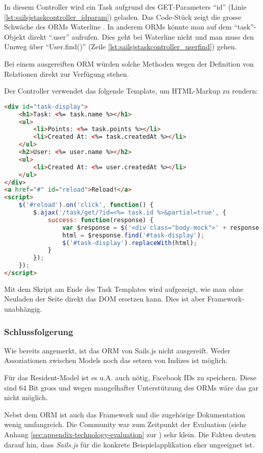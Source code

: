 In diesem Controller wird ein Task aufgrund des GET-Parameters ``id'' (Linie \ref{lst:sailsjstaskcontroller_idparam}) geladen. Das Code-Stück zeigt die grosse Schwäche des ORMs Waterline \cite{Waterline}. In anderem ORMs könnte man auf dem ``task''-Objekt direkt ``.user'' aufrufen. Dies geht bei Waterline nicht und man muss den Umweg über ``User.find()'' (Zeile \ref{lst:sailsjstaskcontroller_userfind}) gehen.

Bei einem ausgereiften ORM würden solche Methoden wegen der Definition von Relationen direkt zur Verfügung stehen.

Der Controller verwendet das folgende Template, um HTML-Markup zu rendern:

\begin{lstlisting}[language=HTML, caption=Task Template]
<div id="task-display">
	<h1>Task: <%= task.name %></h1>
	<ul>
		<li>Points: <%= task.points %></li>
		<li>Created At: <%= task.createdAt %></li>
	</ul>
	<h2>User: <%= user.name %></h2>
	<ul>
		<li>Created At: <%= user.createdAt %></li>
	</ul>
</div>
<a href="#" id="reload">Reload!</a>
<script>
	$('#reload').on('click', function() {
		$.ajax('/task/get/?id=<%= task.id %>&partial=true', {
			success: function(response) {
				var $response = $('<div class="body-mock">' + response + '</div>');
				html = $response.find('#task-display');
				$('#task-display').replaceWith(html);
			}
		});
	});
</script>
\end{lstlisting}

Mit dem Skript am Ende des Task Templates wird aufgezeigt, wie man ohne Neuladen der Seite direkt das DOM ersetzen kann. Dies ist aber Framework-unabhängig.

\subsubsection*{Schlussfolgerung}

Wie bereits angemerkt, ist das ORM von Sails.js nicht ausgereift. Weder Assoziationen zwischen Models \cite{SailsjsModelAssociations} noch das setzen von Indizes ist möglich.

Für das Resident-Model ist es u.A. auch nötig, Facebook IDs zu speichern. Diese sind 64 Bit gross und wegen mangelhafter Unterstützung des ORMs wäre das gar nicht möglich.

Nebst dem ORM ist auch das Framework und die zugehörige Dokumentation wenig umfangreich. Die Community war zum Zeitpunkt der Evaluation (siehe Anhang \ref{sec:appendix-technology-evaluation} zur ) sehr klein. Die Fakten deuten darauf hin, dass \emph{Sails.js} für die konkrete Beispielapplikation eher ungeeignet ist.